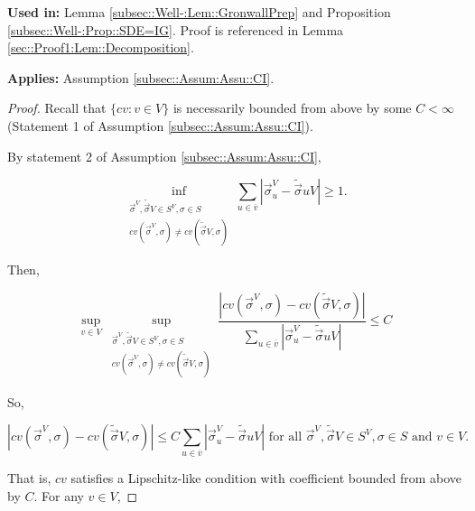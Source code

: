 \documentclass[12pt]{article}
\newcommand{\ov}{\overline}
\newcommand{\te}{\text}
\newcommand{\usein}{\textbf{Used in: }}
\newcommand{\app}{\textbf{Applies: }}
\newcommand{\ind}{\hspace{24pt}}
\renewcommand{\v}{v}							%
\newcommand{\vv}{u}								%
\renewcommand{\S}{S}							%
\newcommand{\s}{\sigma}							%
\newcommand{\sv}{\vec{\s}}						%
\newcommand{\IGr}{c}							%
\newcommand{\carp}[1]{^{#1}}					%
\newcommand{\vsi}[1]{^{#1}}						%
\newcommand{\cind}[1]{_{#1}}					%
\newcommand{\cl}{\ov}							%
\newcommand{\const}{C}							%
\newcommand{\alt}[1]{\widetilde{#1}}			%
\begin{document}
\usein Lemma \ref{subsec::Well-:Lem::GronwallPrep} and Proposition \ref{subsec::Well-:Prop::SDE=IG}. Proof is referenced in Lemma \ref{sec::Proof1:Lem::Decomposition}.

\app Assumption \ref{subsec::Assum:Assu::CI}.

\begin{proof}
Recall that \(\{\IGr{\v}:\v\in V\}\) is necessarily bounded from above by some \(\const{} < \infty\) (Statement 1 of Assumption \ref{subsec::Assum:Assu::CI}). 

\ind By statement 2 of Assumption \ref{subsec::Assum:Assu::CI}, 

\[\inf_{\substack{\sv\cind{}\vsi{V},\alt{\sv}{}{V} \in \S\carp{V}, \s\in \S\\ \IGr{\v}(\sv\cind{}\vsi{V},\s) \neq \IGr{\v}(\alt{\sv}{}{V},\s)}} \sum_{\vv \in \cl{\v}} |\sv\cind{\vv}\vsi{V} - \alt{\sv}{\vv}{V}| \geq 1.\]

Then,

\[\sup_{\v\in V} \sup_{\substack{\sv\cind{}\vsi{V},\alt{\sv}{}{V} \in \S\carp{V}, \s\in \S\\ \IGr{\v}(\sv\cind{}\vsi{V},\s) \neq \IGr{\v}(\alt{\sv}{}{V},\s)}} \frac{|\IGr{\v}(\sv\cind{}\vsi{V},\s) - \IGr{\v}(\alt{\sv}{}{V},\s)|}{\sum_{\vv \in \cl{\v}} |\sv\cind{\vv}\vsi{V} - \alt{\sv}{\vv}{V}|} \leq \const{}\]

So,

\[|\IGr{\v}(\sv\cind{}\vsi{V},\s) - \IGr{\v}(\alt{\sv}{}{V},\s)|\leq \const{}\sum_{\vv \in \cl{\v}} |\sv\cind{\vv}\vsi{V} - \alt{\sv}{\vv}{V}| \te{ for all } \sv\cind{}\vsi{V},\alt{\sv}{}{V}\in \S\carp{V},\s\in \S\te{ and }\v\in V.\]

That is, \(\IGr{\v}\) satisfies a Lipschitz-like condition with coefficient bounded from above by \(\const{}\). For any \(\v\in V\),


\end{proof}
\end{document}
